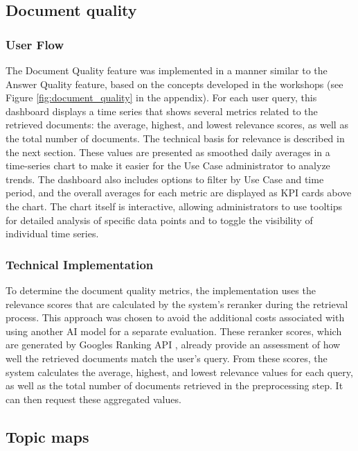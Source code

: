 \documentclass[
	english,
	ruledheaders=section,%
	class=report,%
	thesis={type=bachelor},%
	accentcolor=1b,%
	custommargins=true,%
	marginpar=false,%
	parskip=half-,%
	fontsize=11pt,%
	DIV=14,
]{tudapub}
\begin{document}
\subsection{Document quality}
\subsubsection{User Flow}
The Document Quality feature was implemented in a manner similar to the Answer Quality feature, based on the concepts developed in the workshops (see Figure \ref{fig:document_quality} in the appendix). For each user query, this dashboard displays a time series that shows several metrics related to the retrieved documents: the average, highest, and lowest relevance scores, as well as the total number of documents. The technical basis for relevance is described in the next section. These values are presented as smoothed daily averages in a time-series chart to make it easier for the Use Case administrator to analyze trends. The dashboard also includes options to filter by Use Case and time period, and the overall averages for each metric are displayed as KPI cards above the chart. The chart itself is interactive, allowing administrators to use tooltips for detailed analysis of specific data points and to toggle the visibility of individual time series.

\subsubsection{Technical Implementation}
To determine the document quality metrics, the implementation uses the relevance scores that are calculated by the system's reranker during the retrieval process. This approach was chosen to avoid the additional costs associated with using another AI model for a separate evaluation. These reranker scores, which are generated by Googles Ranking API \parencite{GoogleReranker}, already provide an assessment of how well the retrieved documents match the user's query. From these scores, the system calculates the average, highest, and lowest relevance values for each query, as well as the total number of documents retrieved in the preprocessing step. It can then request these aggregated values.
\subsection{Topic maps}
\end{document}
